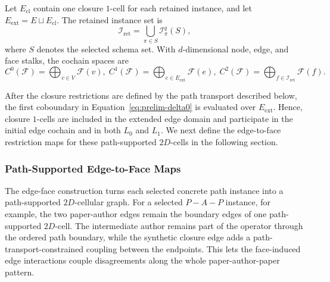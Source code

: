 \documentclass[sigconf,anonymous,review]{acmart}
\newcommand{\cF}{\mathcal{F}}
\begin{document}
Let \(E_{\mathrm{cl}}\) contain one closure \(1\)-cell for each retained
instance, and let \(E_{\mathrm{ext}}=E\sqcup E_{\mathrm{cl}}\). The retained
instance set is
\[
\mathcal{I}_{\mathrm{ret}}
=
\bigcup_{\pi\in S}\mathcal{I}_\pi^q(S),
\]
where \(S\) denotes the selected schema set. With \(d\)-dimensional node,
edge, and face stalks, the cochain spaces are
\begin{equation}
  C^0(\cF)=\bigoplus_{v\in V}\cF(v),
  \;
  C^1(\cF)=\bigoplus_{e\in E_{\mathrm{ext}}}\cF(e),
  \;
  C^2(\cF)=\bigoplus_{f\in\mathcal{I}_{\mathrm{ret}}}\cF(f).
  \label{eq:extended-cochains}
\end{equation}

After the closure restrictions are defined by the path transport described
below, the first coboundary in Equation~\eqref{eq:prelim-delta0} is evaluated
over \(E_{\mathrm{ext}}\). Hence, closure \(1\)-cells are included in the extended edge domain and
participate in the initial edge cochain and in both \(L_0\) and \(L_1\). We next define the edge-to-face restriction maps for these path-supported \(2D\)-cells in the following section.

\subsubsection{Path-Supported Edge-to-Face Maps}
\label{sec:face-geometry}

The edge-face construction turns each selected concrete path instance into a path-supported \(2D\)-cellular graph. For a selected \(P\!-\!A\!-\!P\) instance, for example, the two paper-author edges remain the boundary
edges of one path-supported \(2D\)-cell.  The intermediate author remains part of the operator through the ordered path boundary, while the synthetic closure edge adds a path-transport-constrained coupling between the endpoints.  This lets the face-induced edge interactions
couple disagreements along the whole paper-author-paper pattern.
\end{document}
